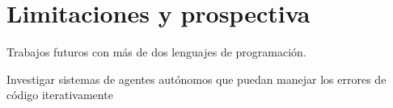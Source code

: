 \chapter{Limitaciones y prospectiva}


Trabajos futuros con más de dos lenguajes de programación.

Investigar sistemas de agentes autónomos que puedan manejar los errores de código iterativamente